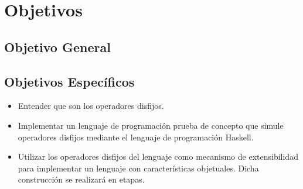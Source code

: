 \chapter{Objetivos}
\section{Objetivo General}

\section{Objetivos Específicos}
\begin{itemize}
\item Entender que son los operadores disfijos.
\item Implementar un lenguaje de programación prueba de concepto que simule operadores
  disfijos mediante el lenguaje de programación Haskell.
\item Utilizar los operadores disfijos del lenguaje como mecanismo de
  extensibilidad para implementar un lenguaje con características
  objetuales. Dicha construcción se realizará en etapas.
\end{itemize}
